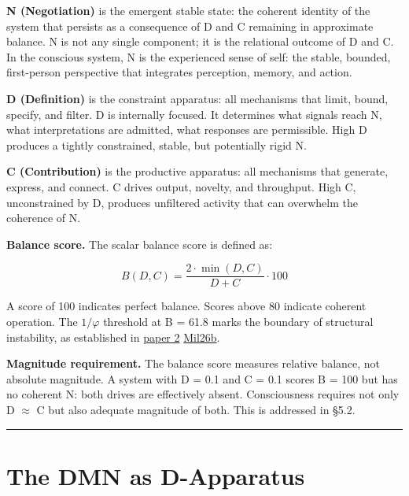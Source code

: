 \documentclass[12pt]{article}
\begin{document}
\textbf{N (Negotiation)} is the emergent stable state: the coherent
identity of the system that persists as a consequence of D and C
remaining in approximate balance. N is not any single component; it is
the relational outcome of D and C. In the conscious system, N is the
experienced sense of self: the stable, bounded, first-person perspective
that integrates perception, memory, and action.

\textbf{D (Definition)} is the constraint apparatus: all mechanisms that
limit, bound, specify, and filter. D is internally focused. It
determines what signals reach N, what interpretations are admitted, what
responses are permissible. High D produces a tightly constrained,
stable, but potentially rigid N.

\textbf{C (Contribution)} is the productive apparatus: all mechanisms
that generate, express, and connect. C drives output, novelty, and
throughput. High C, unconstrained by D, produces unfiltered activity
that can overwhelm the coherence of N.

\textbf{Balance score.} The scalar balance score is defined as:

\[B(D,C) = \frac{2 \cdot \min(D,C)}{D + C} \cdot 100\]

A score of 100 indicates perfect balance. Scores above 80 indicate
coherent operation. The \(1/\varphi\) threshold at B = 61.8 marks the
boundary of structural instability, as established in
\href{https://github.com/baardev/truevalue/blob/main/docnav/Research/papers/2_supply-chain-transparency-tvpci/2_supply-chain-transparency-tvpci.pdf}{paper
2}
\href{https://github.com/baardev/truevalue/blob/main/docnav/Research/papers/2_supply-chain-transparency-tvpci/2_supply-chain-transparency-tvpci.pdf}{Mil26b}.

\textbf{Magnitude requirement.} The balance score measures relative
balance, not absolute magnitude. A system with D = 0.1 and C = 0.1
scores B = 100 but has no coherent N: both drives are effectively
absent. Consciousness requires not only D \(\approx\) C but also
adequate magnitude of both. This is addressed in §5.2.

\begin{center}\rule{0.5\linewidth}{0.5pt}\end{center}

\section{The DMN as D-Apparatus}\label{the-dmn-as-d-apparatus}
\end{document}
